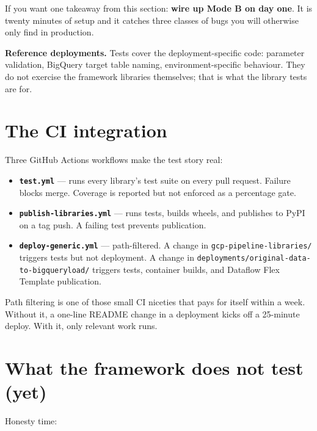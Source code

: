 \documentclass[
  11pt,
  british,
  oneside]{book}
\providecommand{\tightlist}{%
  \setlength{\itemsep}{0pt}\setlength{\parskip}{0pt}}
\begin{document}
If you want one takeaway from this section: \textbf{wire up Mode B on
day one}. It is twenty minutes of setup and it catches three classes of
bugs you will otherwise only find in production.

\textbf{Reference deployments.} Tests cover the deployment-specific
code: parameter validation, BigQuery target table naming,
environment-specific behaviour. They do not exercise the framework
libraries themselves; that is what the library tests are for.

\hypertarget{the-ci-integration}{%
\section{The CI integration}\label{the-ci-integration}}

Three GitHub Actions workflows make the test story real:

\begin{itemize}
\tightlist
\item
  \textbf{\texttt{test.yml}} --- runs every library's test suite on
  every pull request. Failure blocks merge. Coverage is reported but not
  enforced as a percentage gate.
\item
  \textbf{\texttt{publish-libraries.yml}} --- runs tests, builds wheels,
  and publishes to PyPI on a tag push. A failing test prevents
  publication.
\item
  \textbf{\texttt{deploy-generic.yml}} --- path-filtered. A change in
  \texttt{gcp-pipeline-libraries/} triggers tests but not deployment. A
  change in \texttt{deployments/original-data-to-bigqueryload/} triggers
  tests, container builds, and Dataflow Flex Template publication.
\end{itemize}

Path filtering is one of those small CI niceties that pays for itself
within a week. Without it, a one-line README change in a deployment
kicks off a 25-minute deploy. With it, only relevant work runs.

\hypertarget{what-the-framework-does-not-test-yet}{%
\section{What the framework does not test
(yet)}\label{what-the-framework-does-not-test-yet}}

Honesty time:
\end{document}
